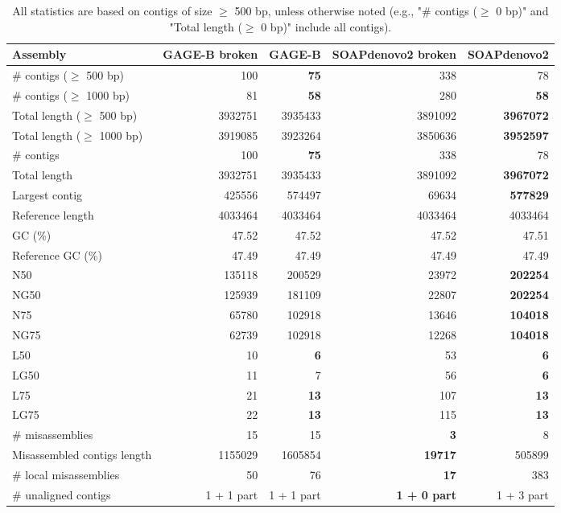 \documentclass[12pt,a4paper]{article}
\begin{document}
\begin{table}[ht]
\begin{center}
\caption{All statistics are based on contigs of size $\geq$ 500 bp, unless otherwise noted (e.g., "\# contigs ($\geq$ 0 bp)" and "Total length ($\geq$ 0 bp)" include all contigs).}
\begin{tabular}{|l*{4}{|r}|}
\hline
Assembly & GAGE-B broken & GAGE-B & SOAPdenovo2 broken & SOAPdenovo2 \\ \hline
\# contigs ($\geq$ 500 bp) & 100 & {\bf 75} & 338 & 78 \\ \hline
\# contigs ($\geq$ 1000 bp) & 81 & {\bf 58} & 280 & {\bf 58} \\ \hline
Total length ($\geq$ 500 bp) & 3932751 & 3935433 & 3891092 & {\bf 3967072} \\ \hline
Total length ($\geq$ 1000 bp) & 3919085 & 3923264 & 3850636 & {\bf 3952597} \\ \hline
\# contigs & 100 & {\bf 75} & 338 & 78 \\ \hline
Total length & 3932751 & 3935433 & 3891092 & {\bf 3967072} \\ \hline
Largest contig & 425556 & 574497 & 69634 & {\bf 577829} \\ \hline
Reference length & 4033464 & 4033464 & 4033464 & 4033464 \\ \hline
GC (\%) & 47.52 & 47.52 & 47.52 & 47.51 \\ \hline
Reference GC (\%) & 47.49 & 47.49 & 47.49 & 47.49 \\ \hline
N50 & 135118 & 200529 & 23972 & {\bf 202254} \\ \hline
NG50 & 125939 & 181109 & 22807 & {\bf 202254} \\ \hline
N75 & 65780 & 102918 & 13646 & {\bf 104018} \\ \hline
NG75 & 62739 & 102918 & 12268 & {\bf 104018} \\ \hline
L50 & 10 & {\bf 6} & 53 & {\bf 6} \\ \hline
LG50 & 11 & 7 & 56 & {\bf 6} \\ \hline
L75 & 21 & {\bf 13} & 107 & {\bf 13} \\ \hline
LG75 & 22 & {\bf 13} & 115 & {\bf 13} \\ \hline
\# misassemblies & 15 & 15 & {\bf 3} & 8 \\ \hline
Misassembled contigs length & 1155029 & 1605854 & {\bf 19717} & 505899 \\ \hline
\# local misassemblies & 50 & 76 & {\bf 17} & 383 \\ \hline
\# unaligned contigs & 1 + 1 part & 1 + 1 part & {\bf 1 + 0 part} & 1 + 3 part \\ \hline

\end{tabular}
\end{center}
\end{table}
\end{document}
